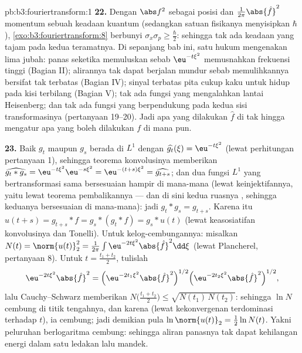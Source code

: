 \begin{solution}{pb:b3:fouriertransform:1}
\textbf{22.} Dengan $\abs f^2$ sebagai  posisi dan
$\frac1{2\pi}\abs{\hat f}^2$  momentum sebuah
keadaan kuantum (sedangkan satuan fisikanya menyisipkan $\hbar$),
\cref{exo:b3:fouriertransform:8} berbunyi $\sigma_x\sigma_p
\geq \frac\hbar2$: sehingga tak ada keadaan yang tajam pada kedua teramatnya.
Di sepanjang bab ini, satu hukum mengenakan lima jubah: panas seketika
memuluskan sebab $\eu^{-t\xi^2}$ memusnahkan frekuensi tinggi
(Bagian II); alirannya tak dapat berjalan mundur sebab memulihkannya
bersifat tak terbatas (Bagian IV); sinyal terbatas pita cukup kaku
untuk hidup pada kisi terbilang (Bagian V); tak ada fungsi yang
mengalahkan lantai Heisenberg; dan tak ada fungsi yang berpendukung 
pada kedua sisi transformasinya (pertanyaan 19--20).
Jadi apa yang dilakukan $\hat f$ di tak hingga mengatur apa yang boleh dilakukan $f$
di mana pun.

\textbf{23.} Baik $g_t$ maupun $g_s$ berada di $L^1$ dengan
$\widehat{g_t}(\xi) = \eu^{-t\xi^2}$ (lewat perhitungan pertanyaan
1), sehingga teorema konvolusinya memberikan
$\widehat{g_t * g_s} = \eu^{-t\xi^2}\eu^{-s\xi^2} =
\eu^{-(t+s)\xi^2} = \widehat{g_{t+s}}$; dan dua fungsi $L^1$
yang bertransformasi sama bersesuaian hampir di mana-mana (lewat keinjektifannya, yaitu lewat
teorema pembalikannya --- dan di sini kedua ruasnya , sehingga
keduanya bersesuaian di mana-mana): jadi $g_t * g_s = g_{t+s}$. Karena itu
$u(t + s) = g_{t+s} * f = g_s * (g_t * f) = g_s * u(t)$
(lewat keasosiatifan konvolusinya dan Tonelli). Untuk kelog-cembungannya: misalkan
$N(t) = \norm{u(t)}_2^2 = \frac1{2\pi}\int
\eu^{-2t\xi^2}\abs{\hat f}^2\dd\xi$ (lewat Plancherel, pertanyaan
8). Untuk $t = \frac{t_1 + t_2}2$, tulislah
\[
\eu^{-2t\xi^2}\abs{\hat f}^2
= \Bigl(\eu^{-2t_1\xi^2}\abs{\hat f}^2\Bigr)^{1/2}
\Bigl(\eu^{-2t_2\xi^2}\abs{\hat f}^2\Bigr)^{1/2},
\]
lalu Cauchy--Schwarz memberikan $N\bigl(\frac{t_1+t_2}2\bigr) \leq
\sqrt{N(t_1)\,N(t_2)}$: sehingga $\ln N$ cembung di titik tengahnya, dan
karena  (lewat kekonvergenan terdominasi terhadap $t$), ia cembung; jadi
demikian pula $\ln\norm{u(t)}_2 = \frac12\ln N(t)$. Yakni peluruhan berlogaritma
cembung: sehingga aliran panasnya tak dapat kehilangan energi dalam satu ledakan lalu
mandek.


\end{solution}
